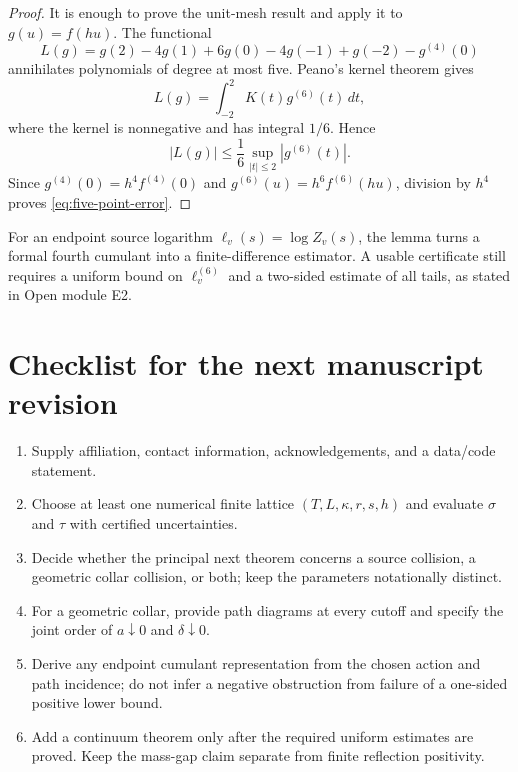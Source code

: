 \documentclass[11pt]{article}
\begin{document}
\begin{proof}
It is enough to prove the unit-mesh result and apply it to $g(u)=f(hu)$.  The functional
\[
  L(g)=g(2)-4g(1)+6g(0)-4g(-1)+g(-2)-g^{(4)}(0)
\]
annihilates polynomials of degree at most five.  Peano's kernel theorem gives
\[
  L(g)=\int_{-2}^{2}K(t)g^{(6)}(t)\,dt,
\]
where the kernel is nonnegative and has integral $1/6$.  Hence
\[
  |L(g)|\le\frac16\sup_{|t|\le2}|g^{(6)}(t)|.
\]
Since $g^{(4)}(0)=h^4f^{(4)}(0)$ and $g^{(6)}(u)=h^6f^{(6)}(hu)$, division by $h^4$ proves \eqref{eq:five-point-error}.
\end{proof}

For an endpoint source logarithm $\ell_v(s)=\log Z_v(s)$, the lemma turns a formal fourth cumulant into a finite-difference estimator.  A usable certificate still requires a uniform bound on $\ell_v^{(6)}$ and a two-sided estimate of all tails, as stated in Open module E2.

\section{Checklist for the next manuscript revision}
\label{app:checklist}

\begin{enumerate}[label=\textbf{P\arabic*.}]
  \item Supply affiliation, contact information, acknowledgements, and a data/code statement.
  \item Choose at least one numerical finite lattice $(T,L,\kappa,r,s,h)$ and evaluate $\sigma$ and $\tau$ with certified uncertainties.
  \item Decide whether the principal next theorem concerns a source collision, a geometric collar collision, or both; keep the parameters notationally distinct.
  \item For a geometric collar, provide path diagrams at every cutoff and specify the joint order of $a\downarrow0$ and $\delta\downarrow0$.
  \item Derive any endpoint cumulant representation from the chosen action and path incidence; do not infer a negative obstruction from failure of a one-sided positive lower bound.
  \item Add a continuum theorem only after the required uniform estimates are proved.  Keep the mass-gap claim separate from finite reflection positivity.
\end{enumerate}
\end{document}

